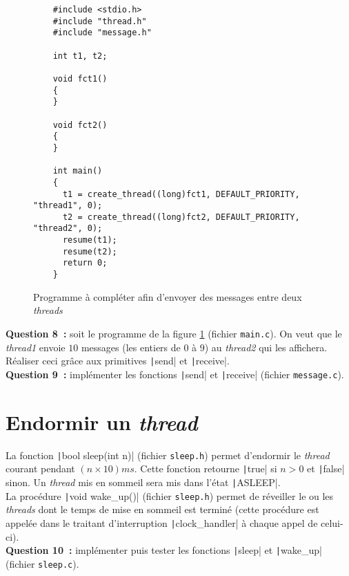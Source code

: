 \documentclass[a4paper]{article}
\begin{document}
\begin{figure}[!htpb]
\begin{verbatim}
    #include <stdio.h>
    #include "thread.h"
    #include "message.h"

    int t1, t2;

    void fct1()
    {
    }

    void fct2()
    {
    }

    int main()
    {
      t1 = create_thread((long)fct1, DEFAULT_PRIORITY, "thread1", 0);
      t2 = create_thread((long)fct2, DEFAULT_PRIORITY, "thread2", 0);
      resume(t1);
      resume(t2);
      return 0;
    }
\end{verbatim}
\caption{Programme à compléter afin d'envoyer des messages entre deux \emph{threads}}
\label{fig:prog5}
\end{figure}


\textbf{Question 8~:} soit le programme de la figure \ref{fig:prog5} (fichier \verb+main.c+). 
On veut que le \emph{thread1} envoie $10$ messages (les entiers de $0$ à $9$) au \emph{thread2} qui les affichera. 
Réaliser ceci grâce aux primitives \texttt|send| et \texttt|receive|.\\

\textbf{Question 9~:} implémenter les fonctions \texttt|send| et \texttt|receive| (fichier \verb+message.c+).

\section{Endormir un \emph{thread}}

La fonction \texttt|bool sleep(int n)| (fichier \verb+sleep.h+)
permet d'endormir le \emph{thread} courant pendant $(n\times 10)ms$. Cette fonction retourne \texttt|true| si $n > 0$ et \texttt|false| sinon.
Un \emph{thread} mis en sommeil sera mis dans l'état \texttt|ASLEEP|.\\

La procédure \texttt|void wake_up()| (fichier \verb+sleep.h+) permet de réveiller le ou les \emph{threads} dont le temps de mise en sommeil
est terminé (cette procédure est appelée dans le traitant d'interruption \texttt|clock_handler| à chaque appel de celui-ci).\\

\textbf{Question 10~:} implémenter puis tester les fonctions \texttt|sleep| et \texttt|wake_up| (fichier \verb+sleep.c+).
\end{document}
